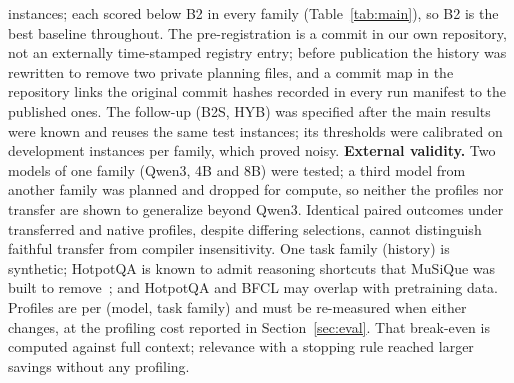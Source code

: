 \RNWeak instances; each scored below B2 in every family (Table~\ref{tab:main}), so B2 is the best baseline throughout. The pre-registration is a commit in our own repository, not an externally time-stamped registry entry; before
publication the history was rewritten to remove two private planning files, and a commit map in the repository links the
original commit hashes recorded in every run manifest to the published ones. The follow-up (B2S, HYB) was specified after the main results were
known and reuses the same test instances; its thresholds were calibrated on \RNCalib development instances per family,
which proved noisy.
\textbf{External validity.} Two models of one family (Qwen3, 4B and 8B) were tested; a third model from another family
was planned and dropped for compute, so neither the profiles nor transfer are shown to generalize beyond Qwen3. Identical paired outcomes under transferred
and native profiles, despite differing selections, cannot distinguish faithful transfer from compiler insensitivity. One task family (history) is
synthetic; HotpotQA is known to admit reasoning shortcuts that MuSiQue was built to remove~\citep{musique2022}; and
HotpotQA and BFCL may overlap with pretraining data. Profiles are per (model, task family) and must be
re-measured when either changes, at the profiling cost reported in Section~\ref{sec:eval}. That break-even is computed
against full context; relevance with a stopping rule reached larger savings without any profiling.
